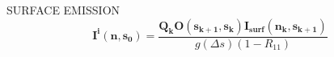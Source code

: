 \begin{minipage}{7cm}
\begin{sf}
SURFACE EMISSION
\[
\mathbf{I^i(n,s_0)}=\frac{\mathbf{Q_k O(s_{k+1},s_k)}
  \mathbf{I_{surf}(n_k,s_{k+1})}}
  {g\left(\Delta s\right)\left(1-R_{11}\right)}
\]
\end{sf}
\end{minipage}
